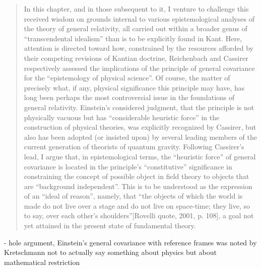 \begin{quote}
    In this chapter, and in those subsequent to it, I venture to challenge this received wisdom on grounds internal to various epistemological analyses of the theory of general relativity, all carried out within a broader genus of ``transcendental idealism'' than is to be explicitly found in Kant.  Here, attention is directed toward how, constrained by the resources afforded by their competing revisions of Kantian doctrine, Reichenbach and Cassirer respectively assessed the implications of the principle of general covariance for the ``epistemology of physical science''.  Of course, the matter of precisely what, if any, physical significance this principle may have, has long been perhaps the most controversial issue in the foundations of general relativity.  Einstein's considered judgment, that the principle is not physically vacuous but has ``considerable heuristic force'' in the construction of physical theories, was explicitly recognized by Cassirer, but also has been adopted (or insisted upon) by several leading members of the current generation of theorists of quantum gravity.  Following Cassirer's lead, I argue that, in epistemological terms, the ``heuristic force'' of general covariance is located in the principle's ``constitutive'' significance in constraining the concept of possible object in field theory to objects that are ``background independent''.  This is to be understood as the expression of an ``ideal of reason'', namely, that ``the objects of which the world is made do not live over a stage and do not live on space-time; they live, so to say, over each other's shoulders''[Rovelli quote, 2001, p. 108], a goal not yet attained in the present state of fundamental theory.
    
    \cite[p. 14-15]{Ryckman2005}
\end{quote}

- hole argument, Einstein's general covariance with reference frames was noted by Kretschmann not to actually say something about physics but about mathematical restriction

